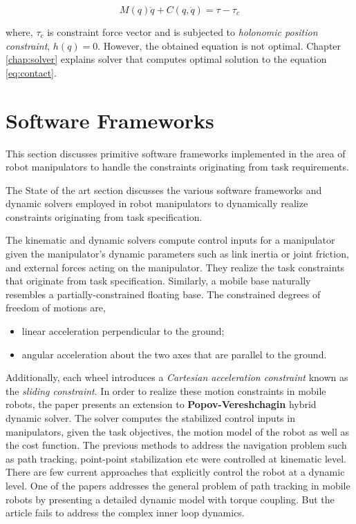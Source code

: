 \begin{equation}\label{eq:contact}
M(q)\ddot{q} + C(q, \ddot{q}) = \tau - \tau_c
\end{equation}

where, $\tau_c$ is constraint force vector and is subjected to \textit{holonomic position constraint}, $h(q) = 0$. However, the obtained equation is not optimal. Chapter \ref{chap:solver} explains solver that computes optimal solution to the equation \ref{eq:contact}.

%

\section{Software Frameworks}

This section discusses primitive software frameworks implemented in the area of robot manipulators to handle the constraints originating from task requirements.

{\color{red}The State of the art section discusses the various software frameworks and dynamic solvers employed in robot manipulators to dynamically realize constraints originating from task specification. 
	
	The kinematic and dynamic solvers compute control inputs for a manipulator given the manipulator’s dynamic parameters such as link inertia or joint friction, and external forces acting on the manipulator. They realize the task constraints that originate from task specification. Similarly, a mobile base naturally resembles a partially-constrained floating base. The constrained degrees of freedom of motions are,
	\begin{itemize}
		\item linear acceleration perpendicular to the ground;
		\item angular acceleration about the two axes that are parallel to the ground.
	\end{itemize}
	
	Additionally, each wheel introduces a \textit{Cartesian acceleration constraint} known as the \textit{sliding constraint}. In order to realize these motion constraints in mobile robots, the paper presents an extension to \textbf{Popov-Vereshchagin} hybrid dynamic solver. The solver computes the stabilized control inputs in manipulators, given the task objectives, the motion model of the robot as well as the cost function. The previous methods to address the navigation problem such as path tracking, point-point stabilization etc were controlled at kinematic level. There are few current approaches that explicitly control the robot at a dynamic level. One of the papers addresses the general problem of path tracking in mobile robots by presenting a detailed dynamic model with torque coupling. But the article fails to address the complex inner loop dynamics. }


